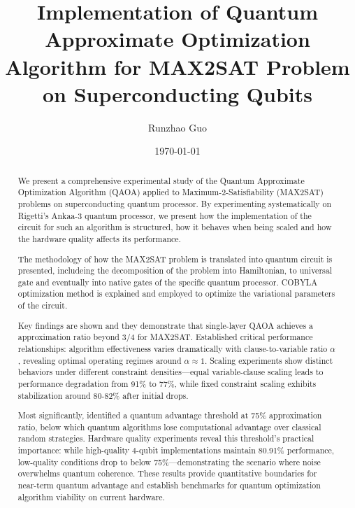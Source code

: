 \documentclass[%
 reprint,
 amsmath,amssymb,
 aps,
]{revtex4-2}
\begin{document}

\title{Implementation of Quantum Approximate Optimization Algorithm for MAX2SAT Problem on Superconducting Qubits}%

\author{Runzhao Guo}


\date{\today}%

\begin{abstract}
We present a comprehensive experimental study of the Quantum Approximate Optimization Algorithm (QAOA) applied to Maximum-2-Satisfiability (MAX2SAT) problems on superconducting quantum processor. By experimenting systematically on Rigetti's Ankaa-3 quantum processor, we present how the implementation of the circuit for such an algorithm is structured, how it behaves when being scaled and how the hardware quality affects its performance. 

The methodology of how the MAX2SAT problem is translated into quantum circuit is presented, includeing the decomposition of the problem into Hamiltonian, to universal gate and eventually into native gates of the specific quantum processor. COBYLA optimization method is explained and employed to optimize the variational parameters of the circuit.

Key findings are shown and they demonstrate that single-layer QAOA achieves a approximation ratio beyond 3/4 for MAX2SAT. Established critical performance relationships: algorithm effectiveness varies dramatically with clause-to-variable ratio $\alpha$, revealing optimal operating regimes around $\alpha \approx 1$. Scaling experiments show distinct behaviors under different constraint densities—equal variable-clause scaling leads to performance degradation from 91\% to 77\%, while fixed constraint scaling exhibits stabilization around 80-82\% after initial drops.

Most significantly, identified a quantum advantage threshold at 75\% approximation ratio, below which quantum algorithms lose computational advantage over classical random strategies. Hardware quality experiments reveal this threshold's practical importance: while high-quality 4-qubit implementations maintain 80.91\% performance, low-quality conditions drop to below 75\%—demonstrating the scenario where noise overwhelms quantum coherence. These results provide quantitative boundaries for near-term quantum advantage and establish benchmarks for quantum optimization algorithm viability on current hardware.
\end{abstract}
\end{document}
